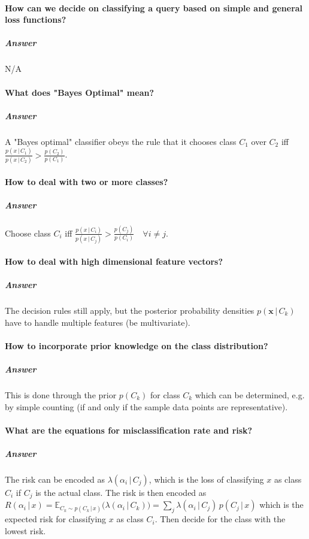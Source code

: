 \documentclass[a4paper, 11pt, accentcolor = tud3b]{tudreport}
\newcommand{\answer}[1]{\subparagraph{Answer} #1}
\newcommand{\E}{\ensuremath{\mathbb{E}}}
\newcommand{\given}{\ensuremath{\,\vert\,}}
\renewcommand{\vec}[1]{\mathbf{#1}}
\begin{document}
			\paragraph{How can we decide on classifying a query based on simple and general loss functions?}
			\answer{N/A} %

			\paragraph{What does "Bayes Optimal" mean?}
			\answer{A "Bayes optimal" classifier obeys the rule that it chooses class \(C_1\) over \(C_2\) iff \( \frac{p(x \given C_1)}{p(x \given C_2)} > \frac{p(C_2)}{p(C_1)} \).}

			\paragraph{How to deal with two or more classes?}
			\answer{Choose class \( C_i \) iff \( \frac{p(x \given C_i)}{p(x \given C_j)} > \frac{p(C_j)}{p(C_i)} \quad \forall i \neq j \).}

			\paragraph{How to deal with high dimensional feature vectors?}
			\answer{The decision rules still apply, but the posterior probability densities \( p(\vec{x} \given C_k) \) have to handle multiple features (be multivariate).}

			\paragraph{How to incorporate prior knowledge on the class distribution?}
			\answer{This is done through the prior \( p(C_k) \) for class \(C_k\) which can be determined, e.g. by simple counting (if and only if the sample data points are representative).}

			\paragraph{What are the equations for misclassification rate and risk?}
			\answer{The risk can be encoded as \( \lambda(\alpha_i \given C_j) \), which is the loss of classifying \( x \) as class \(C_i\) if \( C_j \) is the actual class. The risk is then encoded as \( R(\alpha_i \given x) = \E_{C_k \sim p(C_k \given x)} \big(\lambda(\alpha_i \given C_k)\big) = \sum_j \lambda(\alpha_i \given C_j) \, p(C_j \given x) \) which is the expected risk for classifying \(x\) as class \(C_i\). Then decide for the class with the lowest risk.}
\end{document}
